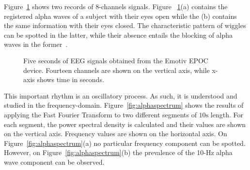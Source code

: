 Figure~\ref{fig:alphawavessignals} shows two records of 8-channels signals.  Figure ~\ref{fig:alphawavessignals}(a) contains the registered alpha waves of a subject with their eyes open while the (b) contains the same information with their eyes closed.  The characteristic pattern of wiggles can be spotted in the latter, while their absence entails the blocking of alpha waves in the former~\cite{Basar2012}. 


\begin{figure}[h!]
\centering
{}
\caption[Alpha Waves Wiggles]{Five seconds of EEG signals obtained from the Emotiv EPOC device.  Fourteen channels are shown on the vertical axis, while x-axis shows time in seconds.}
\label{fig:alphawavessignals}
\end{figure}

This important rhythm is an oscillatory process.  As such, it is understood and studied in the frequency-domain.   Figure~\ref{fig:alphaspectrum} shows the results of applying the Fast Fourier Transform to two different segments of $10\si{\second}$ length.  For each segment, the power spectral density is calculated and their values are shown on the vertical axis.  Frequency values are shown on the horizontal axis.   On Figure~\ref{fig:alphaspectrum}(a) no particular frequency component can be spotted.  However, on Figure~\ref{fig:alphaspectrum}(b) the prevalence of the 10-\si{\hertz} alpha wave component can be observed.   
 

